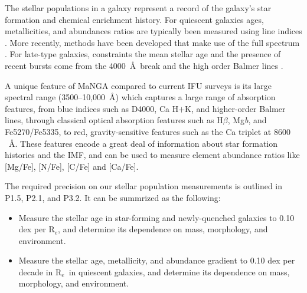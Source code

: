 \documentclass[preprint,11pt]{aastex}
\newcommand{\Hbeta}{{H$\beta$}}
\newcommand{\Reff}{{R$_{e}$}}
\begin{document}
The stellar populations in a galaxy represent a record of the galaxy's star formation and chemical enrichment history.   For quiescent galaxies
ages, metallicities, and abundances ratios are typically been measured
using line indices \citep[e.g.][]{johansson12}.  More recently, methods have been developed that make use of the full spectrum \citep{conroy14}.  For late-type galaxies, constraints the mean stellar age and the presence of recent bursts come from the 4000~\AA\ break and the high order Balmer lines \citep[e.g.][]{kauffmann03a}.

A unique feature of MaNGA compared to current IFU surveys is its large
spectral range (3500--10,000~\AA) which captures a large range of
absorption features, from blue indices such as D4000, Ca H$+$K, and
higher-order Balmer lines, through classical optical absorption
features such as \Hbeta, Mg{\it b}, and Fe5270/Fe5335, to red,
gravity-sensitive features such as the Ca triplet at $8600$~\AA.
These features encode a great deal of information about star formation
histories and the IMF, and can be used to measure element abundance
ratios like [Mg/Fe], [N/Fe], [C/Fe] and [Ca/Fe].


The required precision on our stellar population measurements is  
outlined in P1.5, P2.1, and P3.2. It can be summrized as the following:



\begin{itemize}
\item Measure the stellar age in star-forming and newly-quenched galaxies
 to 0.10 dex per \Reff, and determine its dependence on mass, morphology,
 and environment.

\item Measure the stellar age, metallicity, and abundance gradient to
  0.10 dex per decade in \Reff\ in quiescent galaxies, and determine
  its dependence on mass, morphology, and environment.


\end{itemize}
\end{document}
